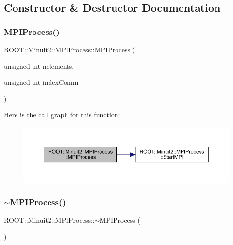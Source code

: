 \subsection{Constructor \& Destructor Documentation}
\mbox{\label{classROOT_1_1Minuit2_1_1MPIProcess_a43d72185b19c2e99f914ff408fd2755b}} 
\subsubsection{\texorpdfstring{MPIProcess()}{MPIProcess()}\hspace{0.1cm}{\footnotesize\ttfamily [1/2]}}
{\footnotesize\ttfamily R\+O\+O\+T\+::\+Minuit2\+::\+M\+P\+I\+Process\+::\+M\+P\+I\+Process (\begin{DoxyParamCaption}\item[{unsigned int}]{nelements,  }\item[{unsigned int}]{index\+Comm }\end{DoxyParamCaption})}

Here is the call graph for this function\+:\nopagebreak
\begin{figure}[H]
\begin{center}
\leavevmode
\includegraphics[width=350pt]{dc/d43/classROOT_1_1Minuit2_1_1MPIProcess_a43d72185b19c2e99f914ff408fd2755b_cgraph}
\end{center}
\end{figure}
\mbox{\label{classROOT_1_1Minuit2_1_1MPIProcess_ac2be6e4b9a721d7f1bf9512580bc113b}} 
\subsubsection{\texorpdfstring{$\sim$MPIProcess()}{~MPIProcess()}\hspace{0.1cm}{\footnotesize\ttfamily [1/2]}}
{\footnotesize\ttfamily R\+O\+O\+T\+::\+Minuit2\+::\+M\+P\+I\+Process\+::$\sim$\+M\+P\+I\+Process (\begin{DoxyParamCaption}{ }\end{DoxyParamCaption})}


